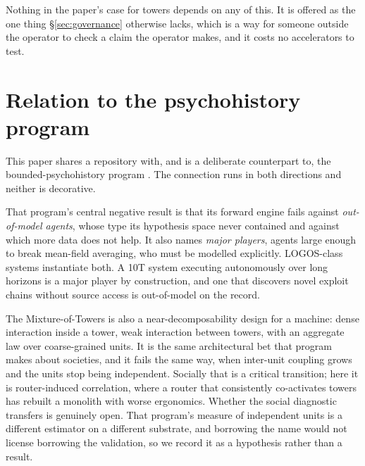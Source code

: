 \documentclass[11pt]{article}
\begin{document}
Nothing in the paper's case for towers depends on any of this. It is offered as the one thing \S\ref{sec:governance} otherwise lacks, which is a way for someone outside the operator to check a claim the operator makes, and it costs no accelerators to test.

\section{Relation to the psychohistory program}
\label{sec:psychohistory}

This paper shares a repository with, and is a deliberate counterpart to, the bounded-psy\-cho\-his\-tory program \cite{sharon2026psychohistory}. The connection runs in both directions and neither is decorative.

That program's central negative result is that its forward engine fails against \emph{out-of-model agents}, whose type its hypothesis space never contained and against which more data does not help. It also names \emph{major players}, agents large enough to break mean-field averaging, who must be modelled explicitly. LOGOS-class systems instantiate both. A 10T system executing autonomously over long horizons is a major player by construction, and one that discovers novel exploit chains without source access \cite{openai2026exploitgym} is out-of-model on the record.

The Mixture-of-Towers is also a near-decomposability design \cite{simon1962} for a machine: dense interaction inside a tower, weak interaction between towers, with an aggregate law over coarse-grained units. It is the same architectural bet that program makes about societies, and it fails the same way, when inter-unit coupling grows and the units stop being independent. Socially that is a critical transition; here it is router-induced correlation, where a router that consistently co-activates towers has rebuilt a monolith with worse ergonomics. Whether the social diagnostic transfers is genuinely open. That program's measure of independent units is a different estimator on a different substrate, and borrowing the name would not license borrowing the validation, so we record it as a hypothesis rather than a result.
\end{document}
